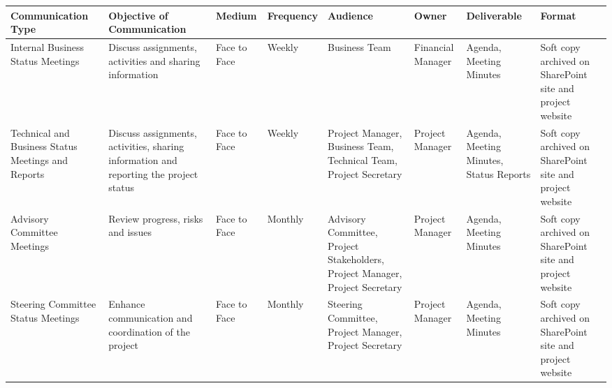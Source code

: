 \begin{landscape}
	
	
	\begin{longtable}{| >{\raggedright\arraybackslash}p{2.8cm}  | >{\raggedright\arraybackslash}p{2.9cm} | >{\raggedright\arraybackslash}p{1.8cm} | >{\raggedright\arraybackslash}p{2cm} | >{\raggedright\arraybackslash}p{2.4cm} | >{\raggedright\arraybackslash}p{2.4cm} | >{\raggedright\arraybackslash}p{2.6cm} | >{\raggedright\arraybackslash}p{2.5cm} |  }
		
		
		\toprule [2pt]
		
		\textbf{Communication Type} & \textbf{Objective of Communication} & \textbf{Medium}  &\textbf{Frequency} &\textbf{Audience}& \textbf{Owner}& \textbf{Deliverable} &\textbf{Format} \\  
		
		\midrule [1.5pt]
		\endhead
		
		Internal Business Status Meetings& Discuss assignments, activities and sharing information  & Face to Face   &  Weekly &Business Team     & Financial Manager  & Agenda, Meeting Minutes  &Soft copy archived on SharePoint site and project website\\  
		
		\hline
		
		Technical and Business Status Meetings and Reports&Discuss assignments, activities, sharing information and reporting the project status   &Face to Face    & Weekly  & Project Manager, Business Team, Technical Team, Project Secretary    &Project Manager   & Agenda, Meeting Minutes, Status Reports  &Soft copy archived on SharePoint site and project website\\  
		
		\hline
		
		Advisory Committee Meetings& Review progress, risks and issues  & Face to Face   &Monthly   &  Advisory Committee, Project Stakeholders, Project Manager, Project Secretary   &Project Manager   & Agenda, Meeting Minutes  &Soft copy archived on SharePoint site and project website\\  
		
		\hline
		
		Steering Committee Status Meetings& Enhance communication and coordination of the project  & Face to Face   & Monthly  & Steering Committee, Project Manager, Project Secretary    &  Project Manager & Agenda, Meeting Minutes  &Soft copy archived on SharePoint site and project website\\  
		

\end{longtable}
\end{landscape}
